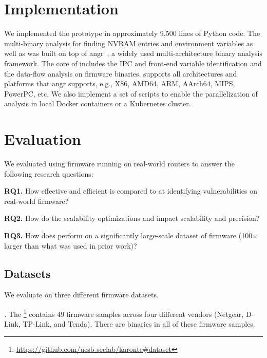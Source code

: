 \section{Implementation}
\label{sec:implementation}

We implemented the \mango prototype in approximately 9,500 lines of Python code.
The multi-binary analysis for finding NVRAM entries and environment variables as well as \rda was built on top of angr~\cite{shoshitaishvili2016sok}, a widely used multi-architecture binary analysis framework.
The core of \mango includes the IPC and front-end variable identification and the data-flow analysis on firmware binaries.
\mango supports all architectures and platforms that angr supports, e.g., X86, AMD64, ARM, AArch64, MIPS, PowerPC, etc.
We also implement a set of scripts to enable the parallelization of \mango analysis in local Docker containers or a Kubernetes cluster.


\section{Evaluation}
\label{sec:evaluation}

We evaluated \mango using firmware running on real-world routers to answer the following research questions:
\smallskip

\noindent
\textbf{RQ1.}
How effective and efficient is \mango compared to \satc at identifying vulnerabilities on real-world firmware?

\noindent
\textbf{RQ2.}
How do the scalability optimizations \rev and \assumed impact scalability and precision?

\noindent
\textbf{RQ3.}
How does \mango perform on a significantly large-scale dataset of firmware (100$\times$ larger than what was used in prior work)?

\subsection{Datasets}
We evaluate \mango on three different firmware datasets.

\smallskip
\noindent
\emph{\karonteDataset.}
The \karonteDataset\footnote{\url{https://github.com/ucsb-seclab/karonte\#dataset}} contains 49 firmware samples across four different vendors (Netgear, D-Link, TP-Link, and Tenda).
There are \mangoCompTotalAnalyzedBins binaries in all of these firmware samples.

